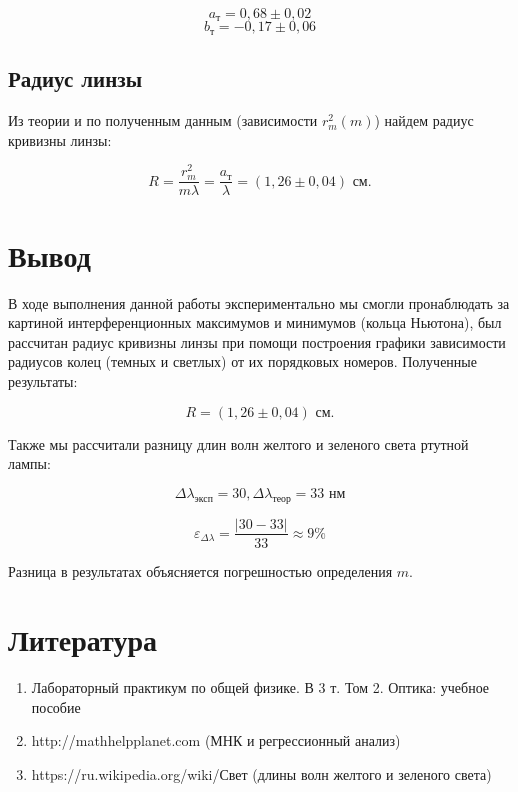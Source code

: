 \documentclass[a4paper, 12pt]{article}%
\begin{document}
\[ a_{\text{т}} = 0,68 \pm 0,02  \]
\[ b_{\text{т}} = -0,17 \pm 0,06 \]

\subsection{Радиус линзы}

Из теории и по полученным данным (зависимости $r_m^2 (m)$) найдем радиус кривизны линзы:

\[ R=\frac{r_{m}^{2}}{m \lambda} = \frac{a_{\text{т}}}{\lambda} = (1,26 \pm 0,04) \text{ см} .\]


\section{Вывод}

В ходе выполнения данной работы экспериментально мы смогли пронаблюдать за картиной интерференционных максимумов и минимумов (кольца Ньютона), был рассчитан радиус кривизны линзы при помощи построения графики зависимости радиусов колец (темных и светлых) от их порядковых номеров. Полученные результаты:

\[ R = (1,26 \pm 0,04) \text{ см} .\]

Также мы рассчитали разницу длин волн желтого и зеленого света ртутной лампы: 

\[ \Delta \lambda_{\text{эксп}} = 30, \Delta \lambda_{\text{теор}} = 33 \text{ нм}\]

\[ \varepsilon_{\Delta \lambda} = \frac{|30 - 33|}{33} \approx 9\% \]

Разница в результатах объясняется погрешностью определения $m$.

\section{Литература}

\begin{enumerate}

\item Лабораторный практикум по общей физике. В 3 т. Том 2. Оптика: учебное пособие

\item http://mathhelpplanet.com (МНК и регрессионный анализ)

\item https://ru.wikipedia.org/wiki/Свет (длины волн желтого и зеленого света)

\end{enumerate}	
\end{document}
